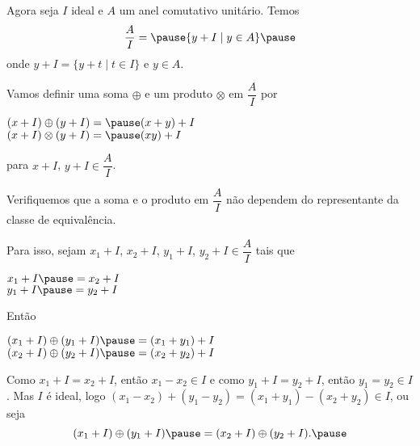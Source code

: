 \documentclass{beamer}
\begin{document}
    \begin{frame}
        Agora seja $I$ ideal \pause e $A$ um anel comutativo unitário. \pause Temos\pause 
        \[
            \dfrac{A}{I} = \pause \{y + I \mid y \in A\}\pause 
        \]
        onde $y + I = \{y + t \mid t \in I\}$ \pause e $y \in A$.\pause 

        Vamos definir uma soma $\oplus$ \pause e um produto $\otimes$ \pause em $\dfrac{A}{I}$ por\pause 
        \begin{center}
            $(x + I) \oplus (y + I) = \pause (x + y) + I$\pause\\
            $(x + I) \otimes (y + I) = \pause (xy) + I$\pause 
        \end{center}
        para $x + I$, \pause $y + I \in \dfrac{A}{I}$.\pause
    \end{frame}

    \begin{frame}
        Verifiquemos que a soma \pause e o produto \pause em $\dfrac{A}{I}$ \pause n{\~a}o dependem do representante da classe de equival{\^e}ncia.\pause

        Para isso, \pause sejam $x_1 + I$, \pause $x_2 + I$, \pause $y_1 + I$, \pause $y_2 + I \in \dfrac{A}{I}$ \pause tais que\pause 
        \begin{center}
            $x_1 + I \pause = x_2 + I$\pause\\
            $y_1 + I \pause = y_2 + I$\pause
        \end{center}

        Ent{\~a}o\pause 
        \begin{center}
            $(x_1 + I) \oplus (y_1 + I) \pause = (x_1 + y_1) + I$\pause\\
            $(x_2 + I) \oplus (y_2 + I) \pause = (x_2 + y_2) + I$\pause
        \end{center}
    \end{frame}

    \begin{frame}
        Como $x_1 + I = x_2 + I$, \pause ent{\~a}o $x_1 - x_2 \in I$ \pause e como $y_1 + I = y_2 + I$, \pause ent{\~a}o $y_1 = y_2 \in I$. \pause Mas $I$ {\'e} ideal, \pause logo $(x_1 - x_2) + (y_1 - y_2) = (x_1 + y_1) - (x_2 + y_2) \in I$, \pause ou seja\pause 
        \[
            (x_1 + I) \oplus (y_1 + I) \pause = (x_2 + I) \oplus (y_2 + I).\pause
        \]
    \end{frame}
\end{document}
